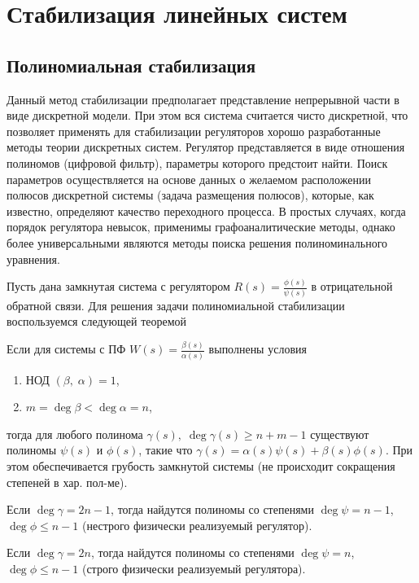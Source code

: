 \documentclass[../../TAU.tex]{subfiles}
\begin{document}
\chapter{Стабилизация линейных систем}

\section{Полиномиальная стабилизация}

    Данный метод стабилизации предполагает представление непрерывной части в виде дискретной модели. 
    При этом вся система считается чисто дискретной, что позволяет применять для стабилизации регуляторов хорошо разработанные методы теории дискретных систем. 
    Регулятор представляется в виде отношения полиномов (цифровой фильтр), параметры которого предстоит найти. 
    Поиск параметров осуществляется на основе данных о желаемом расположении полюсов дискретной системы (задача размещения полюсов), которые, как известно, определяют качество переходного процесса. 
    В простых случаях, когда порядок регулятора невысок, применимы графоаналитические методы, однако более универсальными являются методы поиска решения полиноминального уравнения.
    \cite[стр. 98]{yashin}


    Пусть дана замкнутая система с регулятором $R(s) = \frac{\phi(s)}{\psi(s)}$ в отрицательной обратной связи. 
    Для решения задачи полиномиальной стабилизации воспользуемся следующей теоремой
    \begin{theor}\label{TH1} 
        Если для системы с ПФ $W(s) = \frac{\beta(s)}{\alpha(s)}$ выполнены условия
        \begin{enumerate}
            \item НОД $(\beta,\; \alpha) = 1$,
            \item $m = \deg\beta< \deg\alpha = n$,
        \end{enumerate}
        тогда для любого полинома $\gamma(s),\; \deg\gamma(s) \ge n+m-1$ существуют полиномы $\psi(s)$ и $\phi(s)$, такие что
        $\gamma(s) = \alpha(s)\psi(s) + \beta(s)\phi(s)$. При этом обеспечивается грубость замкнутой системы (не происходит сокращения степеней в хар. пол-ме).
    \end{theor}

    \begin{coroll}
        Если $\deg\gamma = 2n-1$, тогда найдутся полиномы со степенями $\deg\psi = n-1$, $\deg\phi \le n-1$ (нестрого физически реализуемый регулятор).
    \end{coroll}
    \begin{coroll}
        Если $\deg\gamma = 2n$, тогда найдутся полиномы со степенями $\deg\psi = n$, $\deg\phi \le n-1$ (строго физически реализуемый регулятора).
    \end{coroll}
\end{document}
